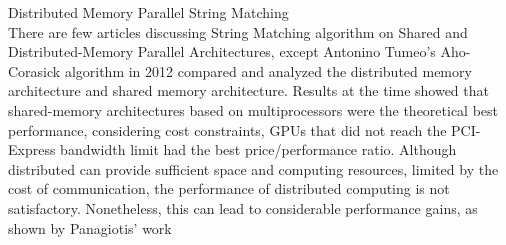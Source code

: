 \documentclass[11pt]{article}       %
\begin{document}
Distributed Memory Parallel String Matching\\
There are few articles discussing String Matching algorithm on Shared and Distributed-Memory Parallel Architectures, except Antonino Tumeo's Aho-Corasick algorithm in 2012 compared and analyzed the distributed memory architecture and shared memory architecture\cite{Distributed-Memory}. Results at the time showed that shared-memory architectures based on multiprocessors were the theoretical best performance, considering cost constraints, GPUs that did not reach the PCI-Express bandwidth limit had the best price/performance ratio. Although distributed can provide sufficient space and computing resources, limited by the cost of communication, the performance of distributed computing is not satisfactory. Nonetheless, this can lead to considerable performance gains, as shown by Panagiotis' work\cite{MPI}\\
\end{document}
